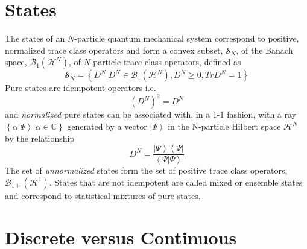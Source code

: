 \documentclass[aps,preprint]{revtex4}%
\begin{document}
\section{States\label{states}}

The states of an $N$-particle quantum mechanical system correspond to
positive, normalized trace class operators and form a convex subset,
$\mathcal{S}_{N}$, of the Banach space, $\mathcal{B}_{1}\left(  \mathcal{H}%
^{N}\right)  $, of $N$-particle trace class operators, defined as%
\begin{equation}
\mathcal{S}_{N}=\left\{  D^{N}|D^{N}\in\mathcal{B}_{1}\left(  \mathcal{H}%
^{N}\right)  ,D^{N}\geq0,TrD^{N}=1\right\}
\end{equation}
Pure states are idempotent operators i.e.
\begin{equation}
\left(  D^{N}\right)  ^{2}=D^{N}%
\end{equation}
and \emph{normalized }pure states\emph{ }can be associated with, in a 1-1
fashion, with a ray $\left\{  \alpha\left\vert \Psi\right\rangle |\alpha
\in\mathbb{C}\right\}  $ generated by a vector $\left\vert \Psi\right\rangle $
in the N-particle Hilbert space $\mathcal{H}^{N}$ by the relationship
\begin{equation}
D^{N}=\frac{\left\vert \Psi\right\rangle \left\langle \Psi\right\vert
}{\left\langle \Psi|\Psi\right\rangle }%
\end{equation}
The set of \textit{unnormalized }states form the set of positive trace class
operators, $\mathcal{B}_{1+}\left(  \mathcal{H}^{1}\right)  $. States that are
not idempotent are called mixed or ensemble states and correspond to
statistical mixtures of pure states.

\section{Discrete versus Continuous \label{Difference}}
\end{document}
